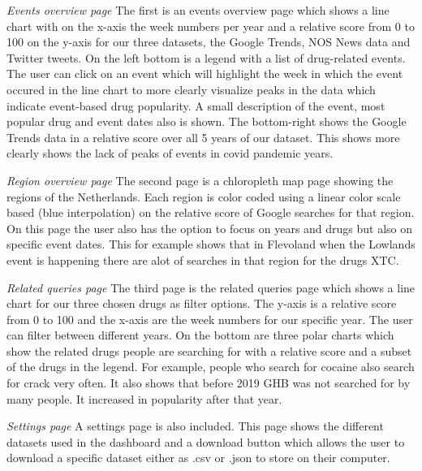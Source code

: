\textit{Events overview page}\newline
The first is an events overview page which shows a line chart with on the x-axis the week numbers per year and a relative score from 0 to 100 on the y-axis for our three datasets, the Google Trends, NOS News data and Twitter tweets. On the left bottom is a legend with a list of drug-related events. The user can click on an event which will highlight the week in which the event occured in the line chart to more clearly visualize peaks in the data which indicate event-based drug popularity. A small description of the event, most popular drug and event dates also is shown. The bottom-right shows the Google Trends data in a relative score over all 5 years of our dataset. This shows more clearly shows the lack of peaks of events in covid pandemic years.

\textit{Region overview page}\newline
The second page is a chloropleth map page showing the regions of the Netherlands. Each region is color coded using a linear color scale based (blue interpolation) on the relative score of Google searches for that region. On this page the user also has the option to focus on years and drugs but also on specific event dates. This for example shows that in Flevoland when the Lowlands event is happening there are alot of searches in that region for the drugs XTC.

\textit{Related queries page}\newline
The third page is the related queries page which shows a line chart for our three chosen drugs as filter options. The y-axis is a relative score from 0 to 100 and the x-axis are the week numbers for our specific year. The user can filter between different years. On the bottom are three polar charts which show the related drugs people are searching for with a relative score and a subset of the drugs in the legend. For example, people who search for cocaine also search for crack very often. It also shows that before 2019 GHB was not searched for by many people. It increased in popularity after that year.

\textit{Settings page}\newline
A settings page is also included. This page shows the different datasets used in the dashboard and a download button which allows the user to download a specific dataset either as .csv or .json to store on their computer.

